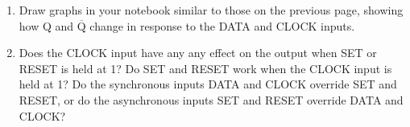 \begin{enumerate}[wide]
\item Draw graphs in your notebook similar to those on the previous page, showing how Q and $\mathrm{\overline{Q}}$ change in response to the DATA and CLOCK inputs.

\item Does the CLOCK input have any any effect on the output when SET or RESET is held at 1?  Do SET and RESET work when the CLOCK input is held at 1?  Do the synchronous inputs DATA and CLOCK override SET and RESET, or do the asynchronous inputs SET and RESET override DATA and CLOCK?
\label{part_synchronous_asynchronous_interference}


\end{enumerate}

